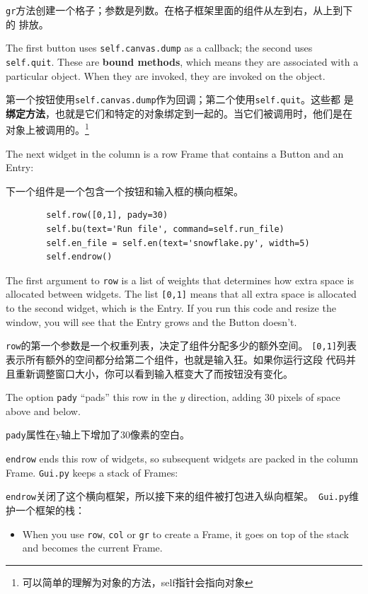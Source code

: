 \documentclass[10pt]{book}
\begin{document}
\begin{CJK}{UTF8}{gbsn}
{\tt gr}方法创建一个格子；参数是列数。在格子框架里面的组件从左到右，从上到下的
排放。

The first button uses {\tt self.canvas.dump} as a callback; the second
uses {\tt self.quit}.  These are {\bf bound methods}, which means they
are associated with a particular object.  When they are invoked, they
are invoked on the object.

第一个按钮使用{\tt self.canvas.dump}作为回调；第二个使用{\tt self.quit}。这些都
是{\bf 绑定方法}，也就是它们和特定的对象绑定到一起的。当它们被调用时，他们是在
对象上被调用的。\footnote{可以简单的理解为对象的方法，self指针会指向对象}

The next widget in the column is a row Frame that contains
a Button and an Entry:

下一个组件是一个包含一个按钮和输入框的横向框架。

\begin{verbatim}
        self.row([0,1], pady=30)
        self.bu(text='Run file', command=self.run_file)
        self.en_file = self.en(text='snowflake.py', width=5)
        self.endrow()
\end{verbatim}
%
The first argument to {\tt row} is a list of weights that
determines how extra space is allocated between widgets.  
The list {\tt [0,1]} means that all extra space is allocated
to the second widget, which is the Entry.  If you run this code
and resize the window, you will see that the Entry grows and
the Button doesn't.

{\tt row}的第一个参数是一个权重列表，决定了组件分配多少的额外空间。
{\tt [0,1]}列表表示所有额外的空间都分给第二个组件，也就是输入狂。如果你运行这段
代码并且重新调整窗口大小，你可以看到输入框变大了而按钮没有变化。

The option {\tt pady} ``pads'' this row in the $y$ direction,
adding 30 pixels of space above and below.

{\tt pady}属性在y轴上下增加了30像素的空白。

{\tt endrow} ends this row of widgets, so subsequent widgets are
packed in the column Frame.  {\tt Gui.py} keeps a stack of Frames:

{\tt endrow}关闭了这个横向框架，所以接下来的组件被打包进入纵向框架。{\tt
Gui.py}维护一个框架的栈：

\begin{itemize}

\item When you use {\tt row}, {\tt col} or {\tt gr} to create a Frame,
it goes on top of the stack and becomes the current Frame.


\end{itemize}
\end{CJK}
\end{document}
